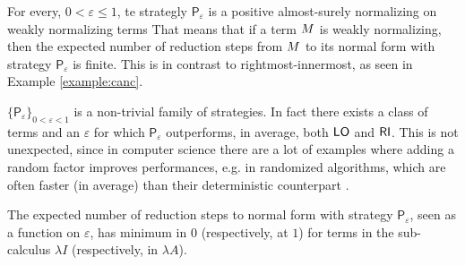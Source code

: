 \begin{varitemize}
	\item
	For every, $0<\varepsilon\leq 1$, te strategly
	$\mathsf{P}_\varepsilon$ is a positive almost-surely normalizing on
	weakly normalizing terms  That means that if a term $M$ is
	weakly normalizing, then the expected number of reduction steps from
	$M$ to its normal form with strategy $\mathsf{P}_\varepsilon$
	is finite. This is in contrast to rightmost-innermost, as seen in
	Example \ref{example:canc}.
	\item
	$\{\mathsf{P}_\varepsilon\}_{0<\varepsilon<1}$ is a non-trivial
	family of strategies. In fact there exists a class of terms and an
	$\varepsilon$ for which $\mathsf{P}_\varepsilon$ outperforms, in
	average, both $\mathsf{LO}$ and $\mathsf{RI}$. This is not unexpected, since in
	computer science there are a lot of examples where adding a random
	factor improves performances, e.g. in randomized algorithms, which
	are often faster (in average) than their deterministic counterpart
	\cite{motwani_randomized_1995}.
	\item
	The expected number of reduction steps to
	normal form with strategy $\mathsf{P}_\varepsilon$, seen as a function
	on $\varepsilon$, has minimum in $0$ (respectively, at $1$) for terms
	in the sub-calculus $\lambda I$ (respectively, in $\lambda A$).
\end{varitemize}
